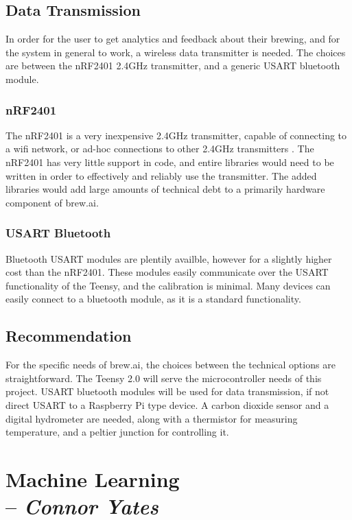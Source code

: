 \subsection{Data Transmission}
In order for the user to get analytics and feedback about their brewing, and for the system in general to work, a wireless data transmitter is needed.
The choices are between the nRF2401 2.4GHz transmitter, and a generic USART bluetooth module.
\subsubsection{nRF2401}
The nRF2401 is a very inexpensive 2.4GHz transmitter, capable of connecting to a wifi network, or ad-hoc connections to other 2.4GHz 
	transmitters \cite{nrf}.
The nRF2401 has very little support in code, and entire libraries would need to be written in order to effectively and reliably use the transmitter.
The added libraries would add large amounts of technical debt to a primarily hardware component of brew.ai.
\subsubsection{USART Bluetooth}
Bluetooth USART modules are plentily availble, however for a slightly higher cost than the nRF2401.
These modules easily communicate over the USART functionality of the Teensy, and the calibration is minimal.
Many devices can easily connect to a bluetooth module, as it is a standard functionality.

\subsection{Recommendation}
For the specific needs of brew.ai, the choices between the technical options are straightforward.
The Teensy 2.0 will serve the microcontroller needs of this project.
USART bluetooth modules will be used for data transmission, if not direct USART to a Raspberry Pi type device.
A carbon dioxide sensor and a digital hydrometer are needed, along with a thermistor for measuring temperature, and a peltier junction for controlling it.

\section{Machine Learning \\ -- \textbf{\textit{Connor Yates}}}
